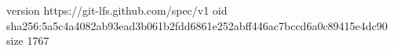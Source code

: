 version https://git-lfs.github.com/spec/v1
oid sha256:5a5c4a4082ab93ead3b061b2fdd6861e252abff446ac7bccd6a0c89415e4dc90
size 1767
